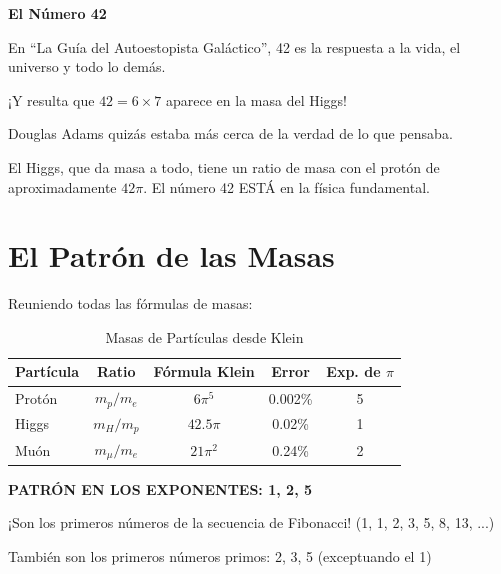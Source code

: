 \begin{analogiabox}
\textbf{El Número 42}

En ``La Guía del Autoestopista Galáctico'', 42 es la respuesta
a la vida, el universo y todo lo demás.

¡Y resulta que $42 = 6 \times 7$ aparece en la masa del Higgs!

Douglas Adams quizás estaba más cerca de la verdad de lo que pensaba.

El Higgs, que da masa a todo, tiene un ratio de masa con el protón
de aproximadamente $42\pi$. El número 42 ESTÁ en la física fundamental.
\end{analogiabox}


\section{El Patrón de las Masas}

Reuniendo todas las fórmulas de masas:

\begin{table}[H]
\centering
\caption{Masas de Partículas desde Klein}
\begin{tabular}{lcccc}
\toprule
\textbf{Partícula} & \textbf{Ratio} & \textbf{Fórmula Klein} & \textbf{Error} & \textbf{Exp. de $\pi$} \\
\midrule
Protón & $m_p/m_e$ & $6\pi^5$ & 0.002\% & 5 \\
Higgs & $m_H/m_p$ & $42.5\pi$ & 0.02\% & 1 \\
Muón & $m_\mu/m_e$ & $21\pi^2$ & 0.24\% & 2 \\
\bottomrule
\end{tabular}
\end{table}

\textbf{PATRÓN EN LOS EXPONENTES: 1, 2, 5}

¡Son los primeros números de la secuencia de Fibonacci! (1, 1, 2, 3, 5, 8, 13, ...)

También son los primeros números primos: 2, 3, 5 (exceptuando el 1)

